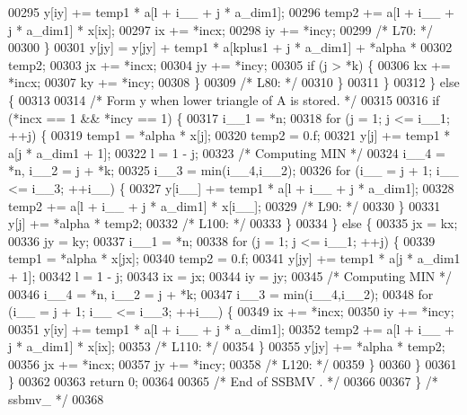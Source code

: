 \begin{DoxyCode}
00295             y[iy] += temp1 * a[l + i\_\_ + j * a\_dim1];
00296             temp2 += a[l + i\_\_ + j * a\_dim1] * x[ix];
00297             ix += *incx;
00298             iy += *incy;
00299 \textcolor{comment}{/* L70: */}
00300         \}
00301         y[jy] = y[jy] + temp1 * a[kplus1 + j * a\_dim1] + *alpha * 
00302             temp2;
00303         jx += *incx;
00304         jy += *incy;
00305         \textcolor{keywordflow}{if} (j > *k) \{
00306             kx += *incx;
00307             ky += *incy;
00308         \}
00309 \textcolor{comment}{/* L80: */}
00310         \}
00311     \}
00312     \} \textcolor{keywordflow}{else} \{
00313 
00314 \textcolor{comment}{/*        Form  y  when lower triangle of A is stored. */}
00315 
00316     \textcolor{keywordflow}{if} (*incx == 1 && *incy == 1) \{
00317         i\_\_1 = *n;
00318         \textcolor{keywordflow}{for} (j = 1; j <= i\_\_1; ++j) \{
00319         temp1 = *alpha * x[j];
00320         temp2 = 0.f;
00321         y[j] += temp1 * a[j * a\_dim1 + 1];
00322         l = 1 - j;
00323 \textcolor{comment}{/* Computing MIN */}
00324         i\_\_4 = *n, i\_\_2 = j + *k;
00325         i\_\_3 = min(i\_\_4,i\_\_2);
00326         \textcolor{keywordflow}{for} (i\_\_ = j + 1; i\_\_ <= i\_\_3; ++i\_\_) \{
00327             y[i\_\_] += temp1 * a[l + i\_\_ + j * a\_dim1];
00328             temp2 += a[l + i\_\_ + j * a\_dim1] * x[i\_\_];
00329 \textcolor{comment}{/* L90: */}
00330         \}
00331         y[j] += *alpha * temp2;
00332 \textcolor{comment}{/* L100: */}
00333         \}
00334     \} \textcolor{keywordflow}{else} \{
00335         jx = kx;
00336         jy = ky;
00337         i\_\_1 = *n;
00338         \textcolor{keywordflow}{for} (j = 1; j <= i\_\_1; ++j) \{
00339         temp1 = *alpha * x[jx];
00340         temp2 = 0.f;
00341         y[jy] += temp1 * a[j * a\_dim1 + 1];
00342         l = 1 - j;
00343         ix = jx;
00344         iy = jy;
00345 \textcolor{comment}{/* Computing MIN */}
00346         i\_\_4 = *n, i\_\_2 = j + *k;
00347         i\_\_3 = min(i\_\_4,i\_\_2);
00348         \textcolor{keywordflow}{for} (i\_\_ = j + 1; i\_\_ <= i\_\_3; ++i\_\_) \{
00349             ix += *incx;
00350             iy += *incy;
00351             y[iy] += temp1 * a[l + i\_\_ + j * a\_dim1];
00352             temp2 += a[l + i\_\_ + j * a\_dim1] * x[ix];
00353 \textcolor{comment}{/* L110: */}
00354         \}
00355         y[jy] += *alpha * temp2;
00356         jx += *incx;
00357         jy += *incy;
00358 \textcolor{comment}{/* L120: */}
00359         \}
00360     \}
00361     \}
00362 
00363     \textcolor{keywordflow}{return} 0;
00364 
00365 \textcolor{comment}{/*     End of SSBMV . */}
00366 
00367 \} \textcolor{comment}{/* ssbmv\_ */}
00368 
\end{DoxyCode}
